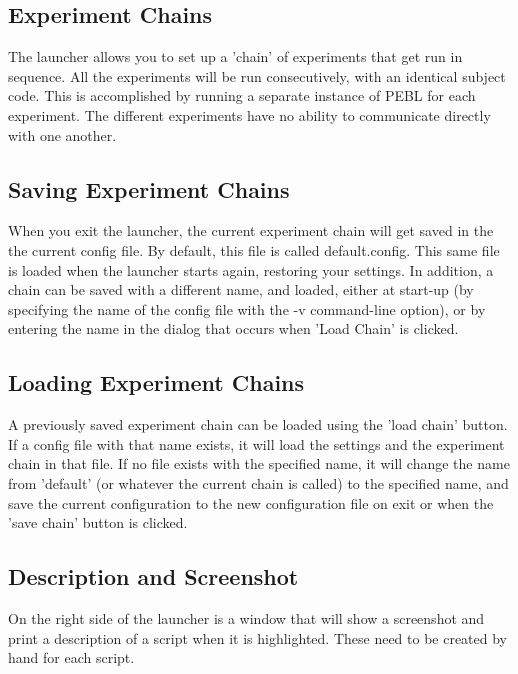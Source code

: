 \subsection{Experiment Chains}
The launcher allows you to set up a 'chain' of experiments that get run in sequence.  All the experiments will be run consecutively, with an identical subject code.  This is accomplished by running a separate instance of PEBL for each experiment.  The different experiments have no ability to communicate directly with one another.


\subsection{Saving Experiment Chains}
When you exit the launcher, the current experiment chain will get saved in the the current config file.  By default, this file is called default.config.  This same file is loaded when the launcher starts again, restoring your settings.  In addition, a chain can be saved with a different name, and loaded, either at start-up (by specifying the name of the config file with the -v command-line option), or by entering the name in the dialog that occurs when 'Load  Chain' is clicked.

\subsection{Loading Experiment Chains}
A previously saved experiment chain can be loaded using the 'load chain' button.  If a config file with that name exists, it will load the settings and the experiment chain in that file.  If no file exists with the specified name, it will change the name from 'default' (or whatever the current chain is called) to the specified name, and save the current configuration to the new configuration file on exit or when the 'save chain' button is clicked.

\subsection{Description and Screenshot}
On the right side of the launcher is a window that will show a screenshot and print a description of a script when it is highlighted.  These need to be created by hand for each script.

